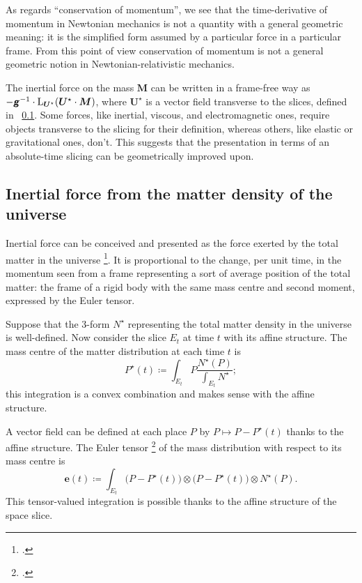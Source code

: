 \documentclass[\ifafour a4paper,12pt,\else a5paper,10pt,\fi%
onecolumn,oneside,article,%
british%
]{memoir}
\theoremstyle{remark}
\theoremstyle{innote}
\newcommand*{\mathte}[1]{\textbf{\textit{\textsf{#1}}}}
\newcommand*{\citep}{\footcites}
\newcommand*{\defd}{\coloneqq}
\renewcommand*{\|}[1][]{\nonscript\,#1\vert\nonscript\;\mathopen{}}
\newcommand*{\sect}{\S}%
\newcommand*{\cf}{{cf.}}
\newcommand*{\puzzle}{{\fontencoding{U}\fontfamily{fontawesometwo}\selectfont\symbol{225}}}
\newcommand*{\psect}{{\footnotesize\puzzle}}%
\newcommand*{\Li}{\mathrm{L}}
\newcommand*{\yd}{N}
\newcommand*{\yrr}{M}
\newcommand*{\yr}{\bm{\yrr}}
\newcommand*{\yrfs}{\yd^{\mathord{\star}}}
\newcommand*{\yP}{P}
\newcommand*{\yPc}{\yP^{\mathord{\star}}}
\newcommand*{\yEu}{E}
\newcommand*{\yeu}{\bm{e}}
\newcommand*{\yFF}{U}
\newcommand*{\yF}{\bm{\yFF}}
\newcommand*{\yFi}{\yF^{\mathord{\star}}}
\newcommand*{\ycfs}{\yFi}
\newcommand*{\ygg}{g}
\newcommand*{\yg}{\mathte{\ygg}}
\begin{document}
As regards \enquote{conservation of momentum}, we see that the
time-derivative of momentum in Newtonian mechanics is not a quantity with a
general geometric meaning: it is the simplified form assumed by a
particular force in a particular frame. From this point of view
conservation of momentum is not a general geometric notion in
Newtonian-relativistic mechanics.




The inertial force on the mass $\yr$ can be written in a frame-free way as
$-\yg^{-1}\cdot \Li_{\yFi}(\yFi\cdot\yr)$, where $\yFi$ is a vector field
transverse to the slices, defined in \psect~\ref{sec:inertial_force}. Some
forces, like inertial, viscous, and electromagnetic ones, require objects
transverse to the slicing for their definition, whereas others, like
elastic or gravitational ones, don't. This suggests that the presentation
in terms of an absolute-time slicing can be geometrically improved upon.

\subsection{Inertial force from the matter density of the universe}
\label{sec:inertial_force}

Inertial force can be conceived and presented as the force exerted by the
total matter in the universe \citep[\cf][]{sciama1953}. It is proportional
to the change, per unit time, in the momentum seen from a frame
representing a sort of average position of the total matter: the frame of a
rigid body with the same mass centre and second moment, expressed by the
Euler tensor.


Suppose that the  3-form $\yrfs$ representing the total matter density in the
universe is well-defined. Now consider the slice $\yEu_t$ at time $t$ with its
affine structure. The mass centre of the matter distribution at each time $t$ is
\begin{equation}
  \label{eq:mass_centre}
  \yPc(t) \defd \int_{\yEu_t} \yP \frac{\yrfs(\yP)}{\int_{\yEu_t}\yrfs};
\end{equation}
this integration is a convex combination and makes sense with the affine
structure. %

A vector field can be defined at each place $\yP$ by
$\yP\mapsto \yP-\yPc(t)$ thanks to the affine structure. The Euler tensor
\citep[\sect~I.10]{truesdell1977_r1991} of the mass distribution with
respect to its mass centre is
\begin{equation}
  \label{eq:euler_univ}
  \yeu(t) \defd \int_{\yEu_t}
  \bigl(\yP -\yPc(t)\bigr)\otimes \bigl(\yP-\yPc(t)\bigr)
  \otimes \yrfs(\yP).
\end{equation}
This tensor-valued integration is possible thanks to the affine structure
of the space slice.
\end{document}

